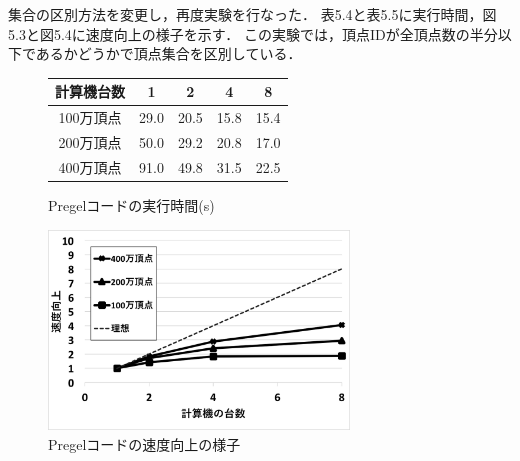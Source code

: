 \documentclass[12pt]{ujreport}
\begin{document}
集合の区別方法を変更し，再度実験を行なった．
表5.4と表5.5に実行時間，図5.3と図5.4に速度向上の様子を示す．
この実験では，頂点IDが全頂点数の半分以下であるかどうかで頂点集合を区別している．

\begin{figure}[ht]
  \begin{minipage}{0.5\textwidth}
    \begin{center}
      \makeatletter
      \def\@captype{table}
      \makeatother
      \begin{tabular}{|c||c|c|c|c|}\hline
        計算機台数 & 1 & 2 & 4 & 8\\ \hline
        100万頂点 & 29.0 & 20.5 & 15.8 & 15.4 \\ \hline
        200万頂点 & 50.0 & 29.2 & 20.8 & 17.0 \\ \hline
        400万頂点 & 91.0 & 49.8 & 31.5 & 22.5 \\ \hline
      \end{tabular}
      \caption{Pregelコードの実行時間(s)}
    \end{center}
  \end{minipage}
  \begin{minipage}{0.7\textwidth}
    \begin{center}
      \includegraphics[width = 8cm]{hanPregel.png}
      \caption{Pregelコードの速度向上の様子}
    \end{center}
  \end{minipage}
\end{figure}
\end{document}
